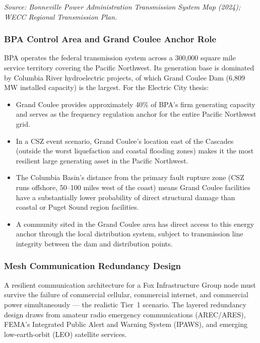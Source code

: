 \documentclass[11pt,letterpaper]{article}
\begin{document}
\textit{Source: Bonneville Power Administration Transmission System Map (2024); WECC Regional Transmission Plan.}

\subsubsection{BPA Control Area and Grand Coulee Anchor Role}

BPA operates the federal transmission system across a 300,000 square mile service territory covering the Pacific Northwest. Its generation base is dominated by Columbia River hydroelectric projects, of which Grand Coulee Dam (6,809 MW installed capacity) is the largest. For the Electric City thesis:

\begin{itemize}[leftmargin=1.5em]
  \item Grand Coulee provides approximately 40\% of BPA's firm generating capacity and serves as the frequency regulation anchor for the entire Pacific Northwest grid.
  \item In a CSZ event scenario, Grand Coulee's location east of the Cascades (outside the worst liquefaction and coastal flooding zones) makes it the most resilient large generating asset in the Pacific Northwest.
  \item The Columbia Basin's distance from the primary fault rupture zone (CSZ runs offshore, 50--100 miles west of the coast) means Grand Coulee facilities have a substantially lower probability of direct structural damage than coastal or Puget Sound region facilities.
  \item A community sited in the Grand Coulee area has direct access to this energy anchor through the local distribution system, subject to transmission line integrity between the dam and distribution points.
\end{itemize}

\subsubsection{Mesh Communication Redundancy Design}

A resilient communication architecture for a Fox Infrastructure Group node must survive the failure of commercial cellular, commercial internet, and commercial power simultaneously --- the realistic Tier~1 scenario. The layered redundancy design draws from amateur radio emergency communications (AREC/ARES), FEMA's Integrated Public Alert and Warning System (IPAWS), and emerging low-earth-orbit (LEO) satellite services.
\end{document}
